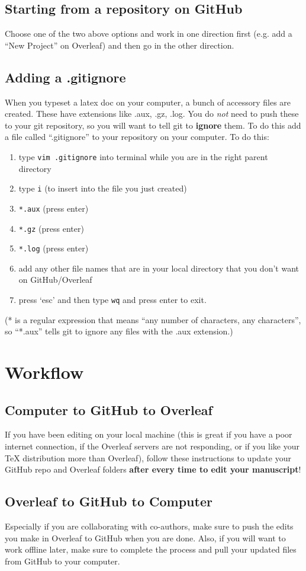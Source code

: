 \documentclass[10pt]{article}
\begin{document}
\subsection{Starting from a repository on GitHub}
Choose one of the two above options and work in one direction first (e.g. add a ``New Project'' on Overleaf) and then go in the other direction.

\subsection{Adding a .gitignore}
When you typeset a latex doc on your computer, a bunch of accessory files are created. These have extensions like .aux, .gz, .log. You do \emph{not} need to push these to your git repository, so you will want to tell git to \textbf{ignore} them. To do this add a file called ``.gitignore'' to your repository on your computer. To do this: 
\begin{enumerate}
\item type \texttt{vim .gitignore} into terminal while you are in the right parent directory
\item type \texttt{i} (to insert into the file you just created)
\item \texttt{*.aux} (press enter)
\item \texttt{*.gz} (press enter)
\item \texttt{*.log} (press enter)
\item add any other file names that are in your local directory that you don't want on GitHub/Overleaf
\item press `esc' and then type \texttt{wq} and press enter to exit.
\end{enumerate}
(* is a regular expression that means ``any number of characters, any characters'', so ``*.aux'' tells git to ignore any files with the .aux extension.)

\section{Workflow}
\subsection{Computer to GitHub to Overleaf}
If you have been editing on your local machine (this is great if you have a poor internet connection, if the Overleaf servers are not responding, or if you like your TeX distribution more than Overleaf), follow these instructions to update your GitHub repo and Overleaf folders \textbf{after every time to edit your manuscript}!

\subsection{Overleaf to GitHub to Computer}
Especially if you are collaborating with co-authors, make sure to push the edits you make in Overleaf to GitHub when you are done. Also, if you will want to work offline later, make sure to complete the process and pull your updated files from GitHub to your computer.
\end{document}

